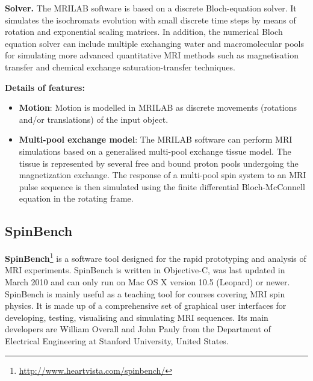 \hfill

\textbf{Solver.} The MRILAB software is based on a discrete Bloch-equation solver.
It simulates the isochromats evolution with small discrete time steps by means of rotation and exponential scaling matrices. 
In addition, the numerical Bloch equation solver can include multiple exchanging water and macromolecular pools for simulating more advanced quantitative MRI methods such as magnetisation transfer and chemical exchange saturation-transfer techniques.

\hfill

\textbf{Details of features:}
\begin{itemize}
    
    \item \textbf{Motion}: Motion is modelled in MRILAB as discrete movements (rotations and/or translations) of the input object.
    
    \item \textbf{Multi-pool exchange model}: The MRILAB software can perform MRI simulations based on a generalised multi-pool exchange tissue model. 
    The tissue is represented by several free and bound proton pools undergoing the magnetization exchange.
    The response of a multi-pool spin system to an MRI pulse sequence is then simulated using the finite differential Bloch-McConnell equation in the rotating frame.
    
\end{itemize}

\hfill

\subsection{SpinBench}
\textbf{SpinBench}\footnote{\url{http://www.heartvista.com/spinbench/}} is a software tool designed for the rapid prototyping and analysis of MRI experiments.
SpinBench is written in Objective-C, was last updated in March 2010 and can only run on Mac OS X version 10.5 (Leopard) or newer.
SpinBench is mainly useful as a teaching tool for courses covering MRI spin physics.
It is made up of a comprehensive set of graphical user interfaces for developing, testing, visualising and simulating MRI sequences. 
Its main developers are William Overall and John Pauly from the Department of Electrical Engineering at Stanford University, United States.


